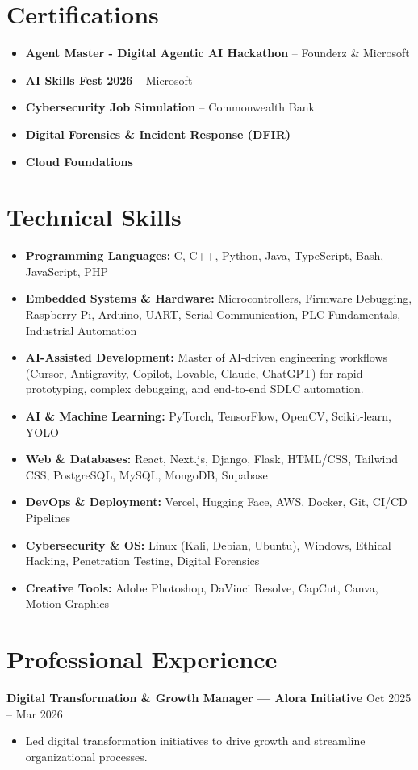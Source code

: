 \documentclass[a4paper,10pt]{article}
\begin{document}
\section{Certifications}
\begin{itemize}[leftmargin=*]
    \item \textbf{Agent Master - Digital Agentic AI Hackathon} -- Founderz \& Microsoft
    \item \textbf{AI Skills Fest 2026} -- Microsoft
    \item \textbf{Cybersecurity Job Simulation} -- Commonwealth Bank
    \item \textbf{Digital Forensics \& Incident Response (DFIR)}
    \item \textbf{Cloud Foundations}
\end{itemize}

\section{Technical Skills}
\begin{itemize}[leftmargin=*]
    \item \textbf{Programming Languages:} C, C++, Python, Java, TypeScript, Bash, JavaScript, PHP
    \item \textbf{Embedded Systems \& Hardware:} Microcontrollers, Firmware Debugging, Raspberry Pi, Arduino, UART, Serial Communication, PLC Fundamentals, Industrial Automation
    \item \textbf{AI-Assisted Development:} Master of AI-driven engineering workflows (Cursor, Antigravity, Copilot, Lovable, Claude, ChatGPT) for rapid prototyping, complex debugging, and end-to-end SDLC automation.
    \item \textbf{AI \& Machine Learning:} PyTorch, TensorFlow, OpenCV, Scikit-learn, YOLO
    \item \textbf{Web \& Databases:} React, Next.js, Django, Flask, HTML/CSS, Tailwind CSS, PostgreSQL, MySQL, MongoDB, Supabase
    \item \textbf{DevOps \& Deployment:} Vercel, Hugging Face, AWS, Docker, Git, CI/CD Pipelines
    \item \textbf{Cybersecurity \& OS:} Linux (Kali, Debian, Ubuntu), Windows, Ethical Hacking, Penetration Testing, Digital Forensics
    \item \textbf{Creative Tools:} Adobe Photoshop, DaVinci Resolve, CapCut, Canva, Motion Graphics
\end{itemize}

\section{Professional Experience}
\textbf{Digital Transformation \& Growth Manager — Alora Initiative} \hfill Oct 2025 – Mar 2026
\begin{itemize}[leftmargin=*]
    \item Led digital transformation initiatives to drive growth and streamline organizational processes.
\end{itemize}
\end{document}
